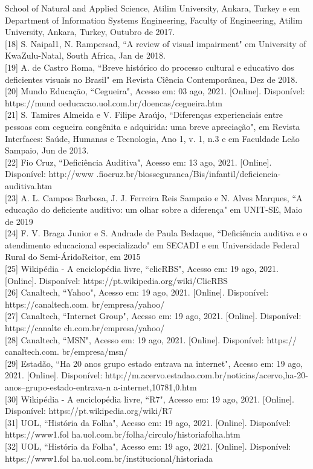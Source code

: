 \documentclass[a4paper]{article}
\begin{document}
\begin{titlepage}
School of Natural and Applied Science, Atilim University, Ankara, Turkey e em Department of Information Systems Engineering, Faculty of Engineering, Atilim University, Ankara, Turkey, Outubro de 2017.\\[0.5cm] [18] S. Naipal1, N. Rampersad, ``A review of visual impairment" em University of KwaZulu-Natal, South Africa, Jan de 2018.\\[0.5cm] [19] A. de Castro Roma, ``Breve histórico do processo cultural e educativo dos deficientes visuais no Brasil" em Revista Ciência Contemporânea, Dez de 2018.\\[0.5cm] [20] Mundo Educação, ``Cegueira", Acesso em: 03 ago, 2021. [Online]. Disponível: https://mund oeducacao.uol.com.br/doencas/cegueira.htm\\[0.5cm] [21] S. Tamires Almeida e V. Filipe Araújo, ``Diferenças experienciais entre pessoas com cegueira congênita e adquirida: uma breve apreciação", em Revista Interfaces: Saúde, Humanas e Tecnologia, Ano 1, v. 1, n.3 e em Faculdade Leão Sampaio, Jun de 2013.\\[0.5cm] [22] Fio Cruz, ``Deficiência Auditiva", Acesso em: 13 ago, 2021. [Online]. Disponível: http://www .fiocruz.br/biosseguranca/Bis/infantil/deficiencia-auditiva.htm\\[0.5cm] [23] A. L. Campos Barbosa, J. J. Ferreira Reis Sampaio e N. Alves Marques, ``A educação do deficiente auditivo: um olhar sobre a diferença" em UNIT-SE, Maio de 2019\\[0.5cm] [24] F. V. Braga Junior e S. Andrade de Paula Bedaque, ``Deficiência auditiva e o atendimento educacional especializado" em SECADI e em Universidade Federal Rural do Semi-ÁridoReitor, em 2015\\[0.5cm] [25] Wikipédia - A enciclopédia livre, ``clicRBS", Acesso em: 19 ago, 2021. [Online]. Disponível: https://pt.wikipedia.org/wiki/ClicRBS\\[0.5cm] [26] Canaltech, ``Yahoo", Acesso em: 19 ago, 2021. [Online]. Disponível: https://canaltech.com. br/empresa/yahoo/\\[0.5cm] [27] Canaltech, ``Internet Group", Acesso em: 19 ago, 2021. [Online]. Disponível: https://canalte ch.com.br/empresa/yahoo/\\[0.5cm] [28] Canaltech, ``MSN", Acesso em: 19 ago, 2021. [Online]. Disponível: https:// canaltech.com. br/empresa/msn/\\[0.5cm] [29] Estadão, ``Ha 20 anos grupo estado entrava na internet", Acesso em: 19 ago, 2021. [Online]. Disponível: http://m.acervo.estadao.com.br/noticias/acervo,ha-20-anos--grupo-estado-entrava-n a-internet,10781,0.htm\\[0.5cm] [30] Wikipédia - A enciclopédia livre, ``R7", Acesso em: 19 ago, 2021. [Online]. Disponível: https://pt.wikipedia.org/wiki/R7\\[0.5cm] [31] UOL, ``História da Folha", Acesso em: 19 ago, 2021. [Online]. Disponível: https://www1.fol ha.uol.com.br/folha/circulo/historia\textunderscore folha.htm\\[0.5cm] [32] UOL, ``História da Folha", Acesso em: 19 ago, 2021. [Online]. Disponível: https://www1.fol ha.uol.com.br/institucional/historia\textunderscore da\textunderscore 
\end{titlepage}
\end{document}
